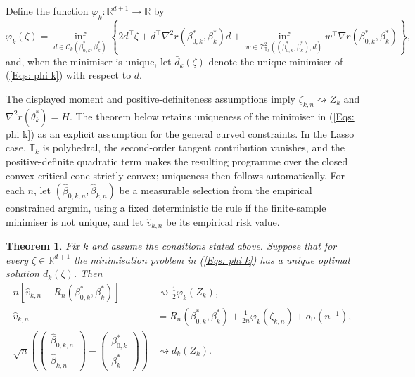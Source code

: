 \documentclass[12pt]{article}
\newtheorem{theorem}{Theorem}
\theoremstyle{remark}
\theoremstyle{plain}
\begin{document}
Define the function $\varphi_{k}:\mathbb{R}^{d+1}\to\mathbb{R}$ by
\begin{equation}
\varphi_{k}(\zeta)=\inf_{d\in \mathcal{C}_{k}(\beta_{0,k}^{*},\beta_{k}^{*})}\left\{ 2d^{\top}\zeta+d^{\top}\nabla^{2}r(\beta_{0,k}^{*},\beta_{k}^{*})d+\inf_{w\in \mathcal{T}_{\mathbb{T}_{k}}^{2}\left((\beta_{0,k}^{*},\beta_{k}^{*}),d\right)}w^{\top}\nabla r(\beta_{0,k}^{*},\beta_{k}^{*})\right\} ,\label{Eqs: phi k}
\end{equation}
and, when the minimiser is unique, let $\bar{d}_{k}(\zeta)$ denote
the unique minimiser of (\ref{Eqs: phi k}) with respect to $d$.

The displayed moment and positive-definiteness assumptions imply $\zeta_{k,n}\rightsquigarrow Z_k$ and $\nabla^2r(\theta_k^*)=H$. The theorem below retains uniqueness of the minimiser in (\ref{Eqs: phi k}) as an explicit assumption for the general curved constraints. In the Lasso case, $\mathbb T_k$ is polyhedral, the second-order tangent contribution vanishes, and the positive-definite quadratic term makes the resulting programme over the closed convex critical cone strictly convex; uniqueness then follows automatically.
For each $n$, let $(\widehat\beta_{0,k,n},\widehat\beta_{k,n})$ be a measurable selection from the empirical constrained argmin, using a fixed deterministic tie rule if the finite-sample minimiser is not unique, and let $\widehat v_{k,n}$ be its empirical risk value.

\begin{theorem}\label{Thm: Shapiro fixed k}
Fix $k$ and assume the conditions stated above. Suppose that for
every $\zeta\in\mathbb{R}^{d+1}$ the minimisation problem in (\ref{Eqs: phi k})
has a unique optimal solution $\bar{d}_{k}(\zeta)$. Then
\begin{align}
n\left[\hat{v}_{k,n}-R_{n}(\beta_{0,k}^{*},\beta_{k}^{*})\right] & \rightsquigarrow\frac{1}{2}\varphi_{k}(Z_{k}),\label{Eqs: value limit}\\
\hat{v}_{k,n} & =R_{n}(\beta_{0,k}^{*},\beta_{k}^{*})+\frac{1}{2n}\varphi_{k}(\zeta_{k,n})+o_{\mathrm{P}}(n^{-1}),\label{Eqs: value expansion}\\
\sqrt{n}\left(\begin{pmatrix}\hat{\beta}_{0,k,n}\\
\hat{\beta}_{k,n}
\end{pmatrix}-\begin{pmatrix}\beta_{0,k}^{*}\\
\beta_{k}^{*}
\end{pmatrix}\right) & \rightsquigarrow\bar{d}_{k}(Z_{k}).\label{Eqs: solution limit}
\end{align}
\end{theorem}
\end{document}
